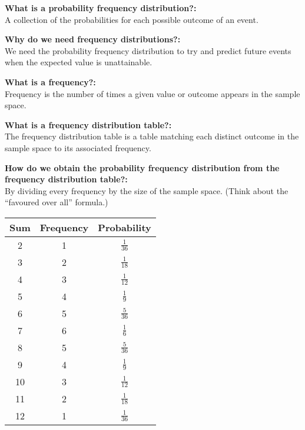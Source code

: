 \documentclass{article}
\begin{document}
\textbf{What is a probability frequency distribution?:}\\
A collection of the probabilities for each possible outcome of an 
event. 

\vspace{.5cm}
\textbf{Why do we need frequency distributions?:}\\
We need the probability frequency distribution to try and predict 
future events when the expected value is unattainable. 

\vspace{.5cm}
\textbf{What is a frequency?:}\\
Frequency is the number of times a given value or outcome 
appears in the sample space. 

\vspace{.5cm}
\textbf{What is a frequency distribution table?:}\\
The frequency distribution table is a table matching each distinct 
outcome in the sample space to its associated frequency.

\vspace{.5cm}
\textbf{How do we obtain the probability frequency distribution from the
frequency distribution table?:}\\
By dividing every frequency by the size of the sample space. 
(Think about the “favoured over all” formula.)

\begin{center}
\begin{tabular}{ccc}
\toprule
Sum & Frequency & Probability \\
\midrule
\vspace{4pt}
2   & 1         & $\frac{1}{36}$ \\
\vspace{4pt}
3   & 2         & $\frac{1}{18}$ \\
\vspace{4pt}
4   & 3         & $\frac{1}{12}$ \\
\vspace{4pt}
5   & 4         & $\frac{1}{9}$ \\
\vspace{4pt}
6   & 5         & $\frac{5}{36}$ \\
\vspace{4pt}
7   & 6         & $\frac{1}{6}$ \\
\vspace{4pt}
8   & 5         & $\frac{5}{36}$ \\
\vspace{4pt}
9   & 4         & $\frac{1}{9}$ \\
\vspace{4pt}
10  & 3         & $\frac{1}{12}$ \\
\vspace{4pt}
11  & 2         & $\frac{1}{18}$ \\
\vspace{4pt}
12  & 1         & $\frac{1}{36}$ \\
\bottomrule
\end{tabular}
\end{center}
\end{document}

